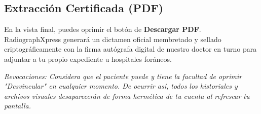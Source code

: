 \documentclass[11pt,a4paper]{article}
\begin{document}
\subsection{Extracción Certificada (PDF)}
En la vista final, puedes oprimir el botón de \textbf{Descargar PDF}. RadiographXpress generará un dictamen oficial membretado y sellado criptográficamente con la firma autógrafa digital de nuestro doctor en turno para adjuntar a tu propio expediente u hospitales foráneos.

\vspace{1cm}
\begin{center}
\textit{Revocaciones: Considera que el paciente puede y tiene la facultad de oprimir "Desvincular" en cualquier momento. De ocurrir así, todos los historiales y archivos visuales desaparecerán de forma hermética de tu cuenta al refrescar tu pantalla.}
\end{center}
\end{document}
